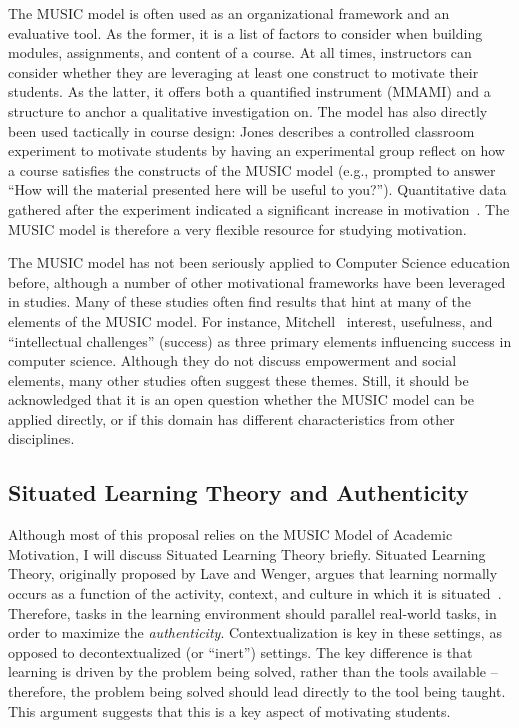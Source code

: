 The MUSIC model is often used as an organizational framework and an evaluative tool.
As the former, it is a list of factors to consider when building modules, assignments, and content of a course.
At all times, instructors can consider whether they are leveraging at least one construct to motivate their students.
As the latter, it offers both a quantified instrument (MMAMI) and a structure to anchor a qualitative investigation on.
The model has also directly been used tactically in course design: Jones describes a controlled classroom experiment to motivate students by having an experimental group reflect on how a course satisfies the constructs of the MUSIC model (e.g., prompted to answer ``How will the material presented here will be useful to you?'').
Quantitative data gathered after the experiment indicated a significant increase in motivation~\cite{mcginley2014brief}.
The MUSIC model is therefore a very flexible resource for studying motivation.

The MUSIC model has not been seriously applied to Computer Science education before, although a number of other motivational frameworks have been leveraged in studies.
Many of these studies often find results that hint at many of the elements of the MUSIC model.
For instance, Mitchell~\cite{Mitchell:2000} interest, usefulness, and ``intellectual challenges'' (success) as three primary elements influencing success in computer science.
Although they do not discuss empowerment and social elements, many other studies often suggest these themes.
Still, it should be acknowledged that it is an open question whether the MUSIC model can be applied directly, or if this domain has different characteristics from other disciplines.

\subsection{Situated Learning Theory and Authenticity}

Although most of this proposal relies on the MUSIC Model of Academic Motivation, I will discuss Situated Learning Theory briefly.
Situated Learning Theory, originally proposed by Lave and Wenger, argues that learning normally occurs as a function of the activity, context, and culture in which it is situated~\cite{lave-situated}.
Therefore, tasks in the learning environment should parallel real-world tasks, in order to maximize the \textit{authenticity}.
Contextualization is key in these settings, as opposed to decontextualized (or ``inert'') settings.
The key difference is that learning is driven by the problem being solved, rather than the tools available – therefore, the problem being solved should lead directly to the tool being taught.
This argument suggests that this is a key aspect of motivating students.

